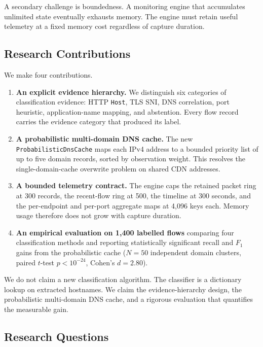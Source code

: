 \documentclass[conference]{IEEEtran}
\begin{document}
A secondary challenge is boundedness. A monitoring engine that
accumulates unlimited state eventually exhausts memory.
The engine must retain useful telemetry at a fixed memory cost
regardless of capture duration.

\subsection{Research Contributions}

We make four contributions.

\begin{enumerate}
\item \textbf{An explicit evidence hierarchy.}
We distinguish six categories of classification evidence:
HTTP \texttt{Host}, TLS SNI, DNS correlation, port heuristic,
application-name mapping, and abstention.
Every flow record carries the evidence category that produced
its label.

\item \textbf{A probabilistic multi-domain DNS cache.}
The new \texttt{ProbabilisticDnsCache} maps each IPv4 address to a
bounded priority list of up to five domain records, sorted by
observation weight. This resolves the single-domain-cache overwrite
problem on shared CDN addresses.

\item \textbf{A bounded telemetry contract.}
The engine caps the retained packet ring at 300 records,
the recent-flow ring at 500, the timeline at 300 seconds,
and the per-endpoint and per-port aggregate maps at 4{,}096 keys each.
Memory usage therefore does not grow with capture duration.

\item \textbf{An empirical evaluation on 1,400 labelled flows}
comparing four classification methods and reporting statistically
significant recall and $F_1$ gains from the probabilistic cache
($N=50$ independent domain clusters, paired $t$-test
$p < 10^{-24}$, Cohen's $d = 2.80$).
\end{enumerate}

We do not claim a new classification algorithm. The classifier is
a dictionary lookup on extracted hostnames. We claim the
evidence-hierarchy design, the probabilistic multi-domain DNS cache,
and a rigorous evaluation that quantifies the measurable gain.

\subsection{Research Questions}
\end{document}
